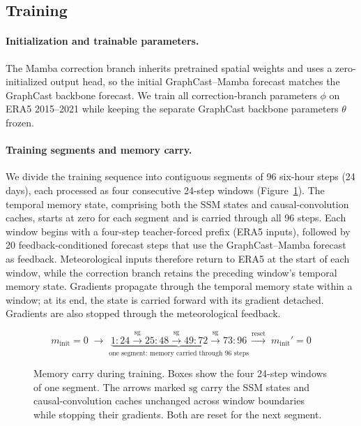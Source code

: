 \documentclass{article}
\begin{document}
\subsection{Training}
\label{sec:training}
\paragraph{Initialization and trainable parameters.}
The Mamba correction branch inherits pretrained spatial weights and uses a zero-initialized output head, so the initial GraphCast--Mamba forecast matches the GraphCast backbone forecast. We train all correction-branch parameters $\phi$ on ERA5 2015--2021 while keeping the separate GraphCast backbone parameters $\theta$ frozen.

\paragraph{Training segments and memory carry.}
We divide the training sequence into contiguous segments of 96 six-hour steps (24 days), each processed as four consecutive 24-step windows (Figure~\ref{fig:training_segments}). The temporal memory state, comprising both the SSM states and causal-convolution caches, starts at zero for each segment and is carried through all 96 steps. Each window begins with a four-step teacher-forced prefix (ERA5 inputs), followed by 20 feedback-conditioned forecast steps that use the GraphCast--Mamba forecast as feedback. Meteorological inputs therefore return to ERA5 at the start of each window, while the correction branch retains the preceding window's temporal memory state. Gradients propagate through the temporal memory state within a window; at its end, the state is carried forward with its gradient detached. Gradients are also stopped through the meteorological feedback.

\begin{figure}[!htbp]
    \centering
    \normalsize
    \[
    m_{\mathrm{init}}=0\;\longrightarrow\;
    \underbrace{
      \boxed{1{:}24}
      \xrightarrow{\mathrm{sg}}\boxed{25{:}48}
      \xrightarrow{\mathrm{sg}}\boxed{49{:}72}
      \xrightarrow{\mathrm{sg}}\boxed{73{:}96}
    }_{\text{one segment: memory carried through 96 steps}}
    \xrightarrow{\mathrm{reset}}\;m_{\mathrm{init}}'=0
    \]
    \caption{Memory carry during training. Boxes show the four 24-step windows of one segment. The arrows marked $\mathrm{sg}$ carry the SSM states and causal-convolution caches unchanged across window boundaries while stopping their gradients. Both are reset for the next segment.}
    \label{fig:training_segments}
\end{figure}
\end{document}
